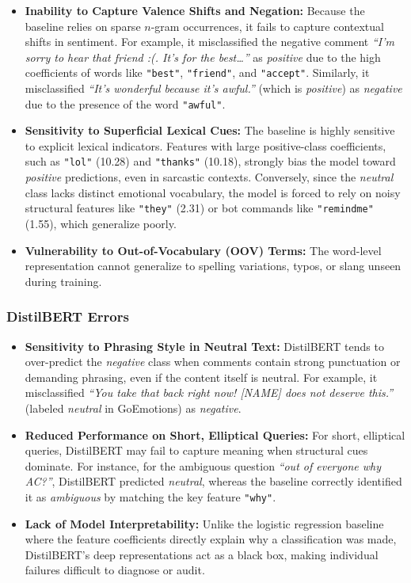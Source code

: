 \documentclass[
  conference,
  letterpaper]{IEEEtran}
\providecommand{\tightlist}{%
  \setlength{\itemsep}{0pt}\setlength{\parskip}{0pt}}
\begin{document}
\begin{itemize}
\tightlist
\item
  \textbf{Inability to Capture Valence Shifts and Negation:} Because the
  baseline relies on sparse \(n\)-gram occurrences, it fails to capture
  contextual shifts in sentiment. For example, it misclassified the
  negative comment \emph{``I'm sorry to hear that friend :(. It's for
  the best\ldots{}''} as \emph{positive} due to the high coefficients of
  words like \texttt{"best"}, \texttt{"friend"}, and \texttt{"accept"}.
  Similarly, it misclassified \emph{``It's wonderful because it's
  awful.''} (which is \emph{positive}) as \emph{negative} due to the
  presence of the word \texttt{"awful"}.
\item
  \textbf{Sensitivity to Superficial Lexical Cues:} The baseline is
  highly sensitive to explicit lexical indicators. Features with large
  positive-class coefficients, such as \texttt{"lol"} (10.28) and
  \texttt{"thanks"} (10.18), strongly bias the model toward
  \emph{positive} predictions, even in sarcastic contexts. Conversely,
  since the \emph{neutral} class lacks distinct emotional vocabulary,
  the model is forced to rely on noisy structural features like
  \texttt{"they"} (2.31) or bot commands like \texttt{"remindme"}
  (1.55), which generalize poorly.
\item
  \textbf{Vulnerability to Out-of-Vocabulary (OOV) Terms:} The
  word-level representation cannot generalize to spelling variations,
  typos, or slang unseen during training.
\end{itemize}

\subsubsection{DistilBERT Errors}\label{distilbert-errors}

\begin{itemize}
\tightlist
\item
  \textbf{Sensitivity to Phrasing Style in Neutral Text:} DistilBERT
  tends to over-predict the \emph{negative} class when comments contain
  strong punctuation or demanding phrasing, even if the content itself
  is neutral. For example, it misclassified \emph{``You take that back
  right now! {[}NAME{]} does not deserve this.''} (labeled
  \emph{neutral} in GoEmotions) as \emph{negative}.
\item
  \textbf{Reduced Performance on Short, Elliptical Queries:} For short,
  elliptical queries, DistilBERT may fail to capture meaning when
  structural cues dominate. For instance, for the ambiguous question
  \emph{``out of everyone why AC?''}, DistilBERT predicted
  \emph{neutral}, whereas the baseline correctly identified it as
  \emph{ambiguous} by matching the key feature \texttt{"why"}.
\item
  \textbf{Lack of Model Interpretability:} Unlike the logistic
  regression baseline where the feature coefficients directly explain
  why a classification was made, DistilBERT's deep representations act
  as a black box, making individual failures difficult to diagnose or
  audit.
\end{itemize}
\end{document}
